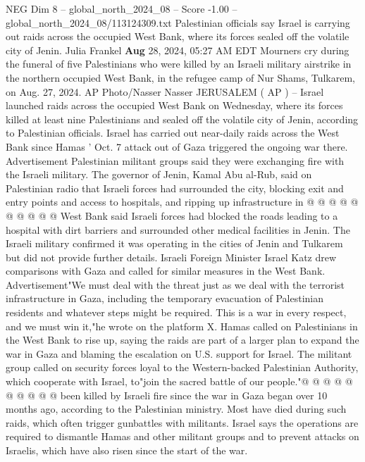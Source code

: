 \begin{textsample}{NEG Dim 8 – global\_north\_2024\_08 – Score -1.00 – global\_north\_2024\_08/113124309.txt}  \label{ex:f8_neg_124}
Palestinian officials say Israel is carrying out raids across the occupied West Bank, where its forces sealed off the volatile city of Jenin.
Julia Frankel \textbf{Aug} 28, 2024, 05:27 AM EDT Mourners cry during the funeral of five Palestinians who were killed by an Israeli military airstrike in the northern occupied West Bank, in the refugee camp of Nur Shams, Tulkarem, on Aug. 27, 2024.
AP Photo/Nasser Nasser JERUSALEM ( AP ) -- Israel launched raids across the occupied West Bank on Wednesday, where its forces killed at least nine Palestinians and sealed off the volatile city of Jenin, according to Palestinian officials.
Israel has carried out near-daily raids across the West Bank since Hamas ' Oct. 7 attack out of Gaza triggered the ongoing war there.
Advertisement Palestinian militant groups said they were exchanging fire with the Israeli military.
The governor of Jenin, Kamal Abu al-Rub, said on Palestinian radio that Israeli forces had surrounded the city, blocking exit and entry points and access to hospitals, and ripping up infrastructure in @ @ @ @ @ @ @ @ @ @ West Bank said Israeli forces had blocked the roads leading to a hospital with dirt barriers and surrounded other medical facilities in Jenin.
The Israeli military confirmed it was operating in the cities of Jenin and Tulkarem but did not provide further details.
Israeli Foreign Minister Israel Katz drew comparisons with Gaza and called for similar measures in the West Bank.
Advertisement"We must deal with the threat just as we deal with the terrorist infrastructure in Gaza, including the temporary evacuation of Palestinian residents and whatever steps might be required.
This is a war in every respect, and we must win it,"he wrote on the platform X.
Hamas called on Palestinians in the West Bank to rise up, saying the raids are part of a larger plan to expand the war in Gaza and blaming the escalation on U.S. support for Israel.
The militant group called on security forces loyal to the Western-backed Palestinian Authority, which cooperate with Israel, to"join the sacred battle of our people."@ @ @ @ @ @ @ @ @ @ been killed by Israeli fire since the war in Gaza began over 10 months ago, according to the Palestinian ministry.
Most have died during such raids, which often trigger gunbattles with militants.
Israel says the operations are required to dismantle Hamas and other militant groups and to prevent attacks on Israelis, which have also risen since the start of the war.

\end{textsample}
